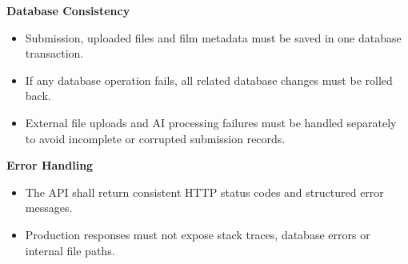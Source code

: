 \vspace{0.5em}
\textbf{Database Consistency}
\begin{itemize}[leftmargin=1.5em, nosep]
    \item Submission, uploaded files and film metadata must be saved in one database transaction.
    \item If any database operation fails, all related database changes must be rolled back.
    \item External file uploads and AI processing failures must be handled separately to avoid incomplete or corrupted submission records.
\end{itemize}

\vspace{0.5em}
\textbf{Error Handling}
\begin{itemize}[leftmargin=1.5em, nosep]
    \item The API shall return consistent HTTP status codes and structured error messages.
    \item Production responses must not expose stack traces, database errors or internal file paths.
\end{itemize}